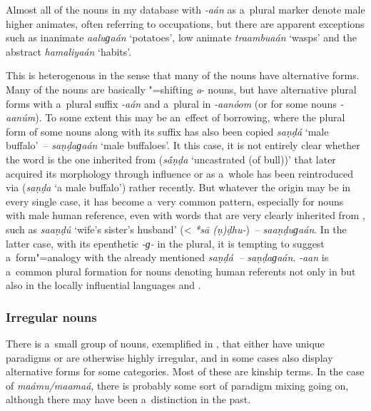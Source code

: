Almost all of the nouns in my database with \textit{-aán} as a~plural marker denote male higher animates, often referring to occupations, but there are apparent exceptions such as inanimate \textit{aaluɡaán} `potatoes', low animate \textit{traambuaán} `wasps' and the abstract  \textit{hamaliyaán} `habits'.


This  is heterogenous in the sense that many of the nouns have alternative forms. Many of
the nouns are basically "=shifting \textit{a}- nouns, but have alternative plural
forms with a~plural suffix \textit{-aán} and a~plural  in
\textit{-aanóom} (or for some nouns \textit{-aanúm}). To some extent
this may be an~effect of borrowing, where the plural form of some \iliPashto nouns along with its suffix
has also been copied \textit{saṇḍá} `male buffalo'~-- \textit{saṇḍaɡaán} `male
buffaloes'. It this case, it is not entirely clear whether the word is the one inherited from \iliOIA
(\textit{s\'{\={a}}ṇḍa} `uncastrated (of bull))' that later acquired its morphology through \iliPashto
influence or as a~whole has been reintroduced via \iliPashto (\textit{saṇḍa} `a male buffalo') rather
recently. But whatever the origin may be in every single case, it has become a~very common pattern,
especially for nouns with male human reference, even with words that are very clearly inherited from
\iliOIA, such as \textit{saaṇḍú} `wife's sister's husband' ({\textless} \textit{*s\={a}\'{
  }(ṇ)ḍhu-})~-- \textit{saaṇḍuɡaán}. In the latter case, with its epenthetic
\textit{-ɡ-} in the plural, it is tempting to suggest a~form"=analogy with the already
mentioned \textit{saṇḍá~-- saṇḍaɡaán}. \textit{-aan} is a~common plural
formation for nouns denoting human referents not only in \iliPashto but also in the locally influential
languages \iliPersian \citep[431]{windfuhrperry2009} and \iliKhowar \citep[221--225]{endresenkristiansen1981}.

\subsubsection*{Irregular nouns}

There is a~small group of nouns, exemplified in , that either have unique paradigms or are otherwise highly irregular, and in some cases also display alternative forms for some categories. Most of these are kinship terms. In the case of \textit{maámu/maamaá}, there is probably some sort of paradigm mixing going on, although there may have been a~distinction in the past.


